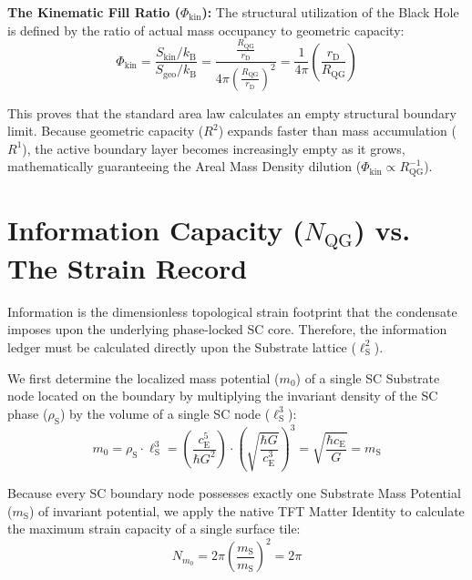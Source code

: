 \noindent\textbf{The Kinematic Fill Ratio ($\Phi_{\mathrm{kin}}$):} The structural utilization of the Black Hole is defined by the ratio of actual mass occupancy to geometric capacity:
\begin{equation}
    \Phi_{\mathrm{kin}} = \frac{S_{\mathrm{kin}}/k_{\mathrm{B}}}{S_{\mathrm{geo}}/k_{\mathrm{B}}} = \frac{\frac{R_{\mathrm{QG}}}{r_{\mathrm{D}}}}{4\pi \left(\frac{R_{\mathrm{QG}}}{r_{\mathrm{D}}}\right)^2} = \frac{1}{4\pi} \left(\frac{r_{\mathrm{D}}}{R_{\mathrm{QG}}}\right)
\end{equation}

This proves that the standard area law calculates an empty structural boundary limit. Because geometric capacity ($R^2$) expands faster than mass accumulation ($R^1$), the active boundary layer becomes increasingly empty as it grows, mathematically guaranteeing the Areal Mass Density dilution ($\Phi_{\mathrm{kin}} \propto R_{\mathrm{QG}}^{-1}$).

\section{Information Capacity ($N_{\mathrm{QG}}$) vs. The Strain Record}

Information is the dimensionless topological strain footprint that the condensate imposes upon the underlying phase-locked SC core. Therefore, the information ledger must be calculated directly upon the Substrate lattice ($\ell_{\mathrm{S}}^2$).

We first determine the localized mass potential ($m_0$) of a single SC Substrate node located on the boundary by multiplying the invariant density of the SC phase ($\rho_{\mathrm{S}}$) by the volume of a single SC node ($\ell_{\mathrm{S}}^3$):
\begin{equation}
    m_0 = \rho_{\mathrm{S}} \cdot \ell_{\mathrm{S}}^3 = \left( \frac{c_{\mathrm{E}}^5}{\hbar G^2} \right) \cdot \left( \sqrt{\frac{\hbar G}{c_{\mathrm{E}}^3}} \right)^3 = \sqrt{\frac{\hbar c_{\mathrm{E}}}{G}} = m_{\mathrm{S}}
\end{equation}

Because every SC boundary node possesses exactly one Substrate Mass Potential ($m_{\mathrm{S}}$) of invariant potential, we apply the native TFT Matter Identity to calculate the maximum strain capacity of a single surface tile:
\begin{equation}
    N_{m_0} = 2\pi\left(\frac{m_{\mathrm{S}}}{m_{\mathrm{S}}}\right)^2 = 2\pi
\end{equation}

